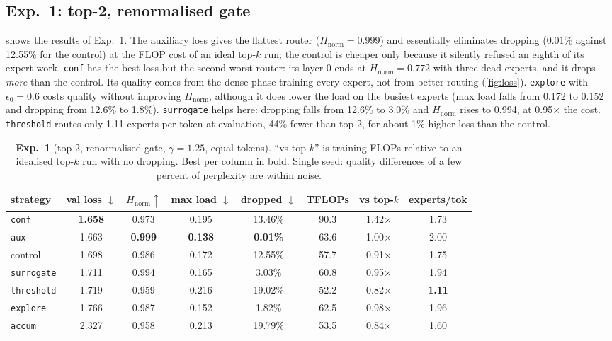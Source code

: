 \documentclass[10pt]{article}
\theoremstyle{definition}
\theoremstyle{remark}
\newcommand{\Hn}{H_{\mathrm{norm}}}
\newcommand{\code}[1]{\texttt{#1}}
\begin{document}
\subsection{Exp.~1: top-2, renormalised gate}
 shows the results of Exp.~1. The auxiliary loss gives the flattest router ($\Hn=0.999$) and essentially eliminates dropping (0.01\% against 12.55\% for the control) at the FLOP cost of an ideal top-$k$ run; the control is cheaper only because it silently refused an eighth of its expert work. \code{conf} has the best loss but the second-worst router: its layer 0 ends at $\Hn=0.772$ with three dead experts, and it drops \emph{more} than the control. Its quality comes from the dense phase training every expert, not from better routing (\cref{fig:loss}). \code{explore} with $\epsilon_0=0.6$ costs quality without improving $\Hn$, although it does lower the load on the busiest experts (max load falls from 0.172 to 0.152 and dropping from 12.6\% to 1.8\%). \code{surrogate} helps here: dropping falls from 12.6\% to 3.0\% and $\Hn$ rises to 0.994, at 0.95$\times$ the cost. \code{threshold} routes only 1.11 experts per token at evaluation, 44\% fewer than top-2, for about 1\% higher loss than the control.

\begin{table}[htbp]
\centering
\caption{\textbf{Exp.~1} (top-2, renormalised gate, $\gamma=1.25$, equal tokens). ``vs top-$k$'' is training FLOPs relative to an idealised top-$k$ run with no dropping. Best per column in bold. Single seed: quality differences of a few percent of perplexity are within noise.}
\label{tab:exp1}
\small
\begin{tabular}{lccccccc}
\toprule
strategy & val loss $\downarrow$ & $\Hn\uparrow$ & max load $\downarrow$ & dropped $\downarrow$ & TFLOPs & vs top-$k$ & experts/tok \\
\midrule
\code{conf}      & \textbf{1.658} & 0.973 & 0.195 & 13.46\% & 90.3 & 1.42$\times$ & 1.73 \\
\code{aux}       & 1.663 & \textbf{0.999} & \textbf{0.138} & \textbf{0.01\%} & 63.6 & 1.00$\times$ & 2.00 \\
control          & 1.698 & 0.986 & 0.172 & 12.55\% & 57.7 & 0.91$\times$ & 1.75 \\
\code{surrogate} & 1.711 & 0.994 & 0.165 & 3.03\% & 60.8 & 0.95$\times$ & 1.94 \\
\code{threshold} & 1.719 & 0.959 & 0.216 & 19.02\% & 52.2 & 0.82$\times$ & \textbf{1.11} \\
\code{explore}   & 1.766 & 0.987 & 0.152 & 1.82\% & 62.5 & 0.98$\times$ & 1.96 \\
\code{accum}     & 2.327 & 0.958 & 0.213 & 19.79\% & 53.5 & 0.84$\times$ & 1.60 \\
\bottomrule
\end{tabular}
\end{table}
\end{document}
